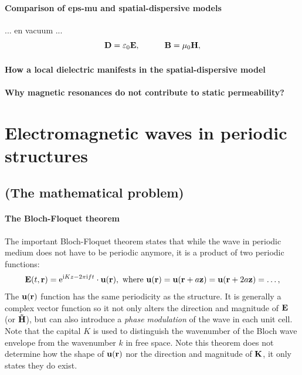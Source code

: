 \paragraph{Comparison of eps-mu and spatial-dispersive models}%
... en vacuum ...
\begin{equation}		\mathbf{D} = \varepsilon_0	\mathbf{E}, \quad\quad\quad						\mathbf{B} = \mu_0			\mathbf{H},				 \label{eq_ce_dispersive}\end{equation}
\paragraph{How a local dielectric manifests in the spatial-dispersive model}  %
\paragraph{Why magnetic resonances do not contribute to static permeability?}%

\section{Electromagnetic waves in periodic structures}
\subsection{(The mathematical problem)}
\paragraph{The Bloch-Floquet theorem}%

The important Bloch-Floquet theorem states that while the wave in periodic medium does not have to be periodic anymore, it is a product of two periodic functions:
\begin{equation} \mathbf{E}(t, {\mathbf{r}}) = \mathrm{e}^{\mathrm{i} Kz - 2\pi \mathrm{i} f t} \cdot \mathbf{u}({\mathbf{r}}), \text{ where } \mathbf{u}({\mathbf{r}}) = \mathbf{u}({\mathbf{r}}+a\mathbf{z}) = \mathbf{u}({\mathbf{r}}+2a\mathbf{z}) = \ldots, \label{eq_bloch}\end{equation} 
The $\mathbf{u}({\mathbf{r}})$ function has the same periodicity as the structure. It is generally a complex vector function so it not only alters the direction and magnitude of $\mathbf{E}$ (or  $\mathbf{\tilde{H}}$), but can also introduce a \textit{phase modulation} of the wave in each unit cell. Note that the capital $K$ is used to distinguish the wavenumber of the Bloch wave envelope from the wavenumber $k$ in free space. Note this theorem does not determine how the shape of $\mathbf{u}({\mathbf{r}})$ nor the direction and magnitude of ${\mathbf{K}}$, it only states they do exist.
